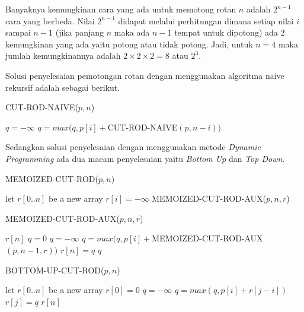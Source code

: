 Banyaknya kemungkinan cara yang ada untuk memotong rotan $n$ adalah $2^{n-1}$ cara yang berbeda. Nilai $2^{n-1}$ didapat melalui perhitungan dimana setiap nilai $i$ sampai $n-1$ (jika panjang $n$ maka ada $n-1$ tempat untuk dipotong) ada 2 kemungkinan yang ada yaitu potong atau tidak potong. Jadi, untuk $n=4$ maka jumlah kemungkinannya adalah $2\times{}2\times{}2 = 8$ atau $2^3$. 

Solusi penyelesaian pemotongan rotan dengan menggunakan algoritma naive rekursif adalah sebagai berikut.

\begin{algorithm}
	\caption{CUT-ROD-NAIVE($p,n$)}
	\label{algo:cutRodNaive}
	\begin{algorithmic}[1]
		\ENDIF
		\STATE $q=-\infty$
			\STATE $q= max(q, p[i] + $CUT-ROD-NAIVE$(p,n-i))$
		\ENDFOR
	\end{algorithmic}
\end{algorithm}

Sedangkan solusi penyelesaian dengan menggunakan metode \textit{Dynamic Programming} ada dua macam penyelesaian yaitu \textit{Bottom Up} dan \textit{Top Down}.

\begin{algorithm}
	\caption{MEMOIZED-CUT-ROD($p,n$)}
	\label{algo:memoizedCutRod}
	\begin{algorithmic}[1]
		\STATE let $r[0..n]$ be a new array
			\STATE $r[i]=-\infty$
		\ENDFOR
		\RETURN MEMOIZED-CUT-ROD-AUX($p,n,r$)
	\end{algorithmic}
\end{algorithm}

\begin{algorithm}
	\caption{MEMOIZED-CUT-ROD-AUX($p,n,r$)}
	\label{algo:memoizedCutRodAux}
	\begin{algorithmic}[1]
			\RETURN $r[n]$
		\ENDIF
			\STATE $q=0$
		\ELSE
			\STATE $q=-\infty$
				\STATE $q=max(q,p[i]+$MEMOIZED-CUT-ROD-AUX$(p,n-1,r))$
			\ENDFOR
		\ENDIF
		\STATE $r[n]=q$
		\RETURN $q$
	\end{algorithmic}
\end{algorithm}

\begin{algorithm}
	\caption{BOTTOM-UP-CUT-ROD($p,n$)}
	\label{algo:bottomUpCutRod}
	\begin{algorithmic}[1]
		\STATE let $r[0..n]$ be a new array
		\STATE $r[0] = 0$
			\STATE $q=-\infty$
				\STATE $q=max(q,p[i]+r[j-i])$
			\ENDFOR
			\STATE $r[j] = q$
		\ENDFOR
		\RETURN $r[n]$
	\end{algorithmic}
\end{algorithm}

